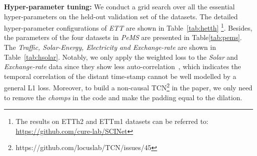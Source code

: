 \documentclass{article}
\begin{document}
\textbf{Hyper-parameter tuning:}
We conduct a grid search over all the essential hyper-parameters on the held-out validation set of the datasets. The detailed hyper-parameter configurations of \emph{ETT} are shown in Table~\ref{tab:hetth} \footnote{The results on ETTh2 and ETTm1 datasets can be referred to: \url{https://github.com/cure-lab/SCINet} }. Besides, the parameters of the four datasets in \emph{PeMS} are presented in  Table\ref{tab:pems}. The \emph{Traffic, Solar-Energy, Electricity and Exchange-rate} are shown in Table~\ref{tab:hsolar}.  
Notably, we only apply the weighted loss to the \textit{Solar} and \textit{Exchange-rate} data since they show less auto-correlation~\cite{Lai2018ModelingLA}, which indicates the temporal correlation of the distant time-stamp cannot be well modelled by a general L1 loss. 
Moreover, to build a non-causal TCN\footnote{https://github.com/locuslab/TCN/issues/45} in the paper, we only need to remove the \emph{chomps} in the code and make the padding equal to the dilation.







\newpage
\end{document}
